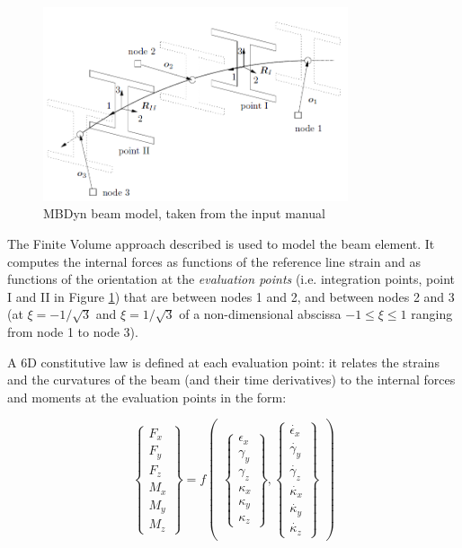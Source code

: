 \begin{figure}[htbp!]
	\centering
	\includegraphics[width=0.8\textwidth]{images/beam_model}
	\caption{MBDyn beam model, taken from the input manual}
	\label{fig:mbdyn-beam-model}
\end{figure}


The Finite Volume approach described \cite{ghiringhelli2000multibody} is used to model the beam element. It computes the internal forces as functions of the reference line strain and as functions of the  orientation at the \textit{evaluation points} (i.e. integration points, point I and II in Figure \ref{fig:mbdyn-beam-model}) that are between nodes 1 and 2, and between nodes 2 and 3 (at $\xi =-1/\sqrt{3}$ and $\xi = 1/\sqrt{3}$ of a non-dimensional abscissa $-1\leq \xi \leq 1$ ranging from node 1 to node 3).


A 6D constitutive law is defined at each evaluation point: it relates the strains and the curvatures of the beam (and their time derivatives) to the internal forces and moments at the evaluation points in the form:

\begin{equation}
	\begin{Bmatrix}
		F_x \\ F_y \\ F_z \\ M_x \\ M_y \\ M_z
	\end{Bmatrix} = f
	\begin{pmatrix}
		\begin{Bmatrix}
			\epsilon_x \\ \gamma_y \\ \gamma_z \\ \kappa_x \\ \kappa_y \\ \kappa_z
		\end{Bmatrix} , 
		\begin{Bmatrix}
			\dot{\epsilon_x} \\ \dot{\gamma_y} \\ \dot{\gamma_z} \\ \dot{\kappa_x} \\ \dot{\kappa_y} \\ \dot{\kappa_z}
		\end{Bmatrix}
	\end{pmatrix}
\end{equation}


